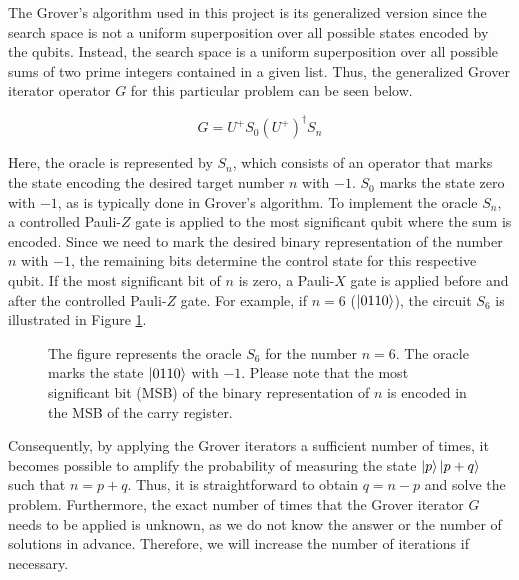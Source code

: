\documentclass[12pt, a4paper]{article}
\begin{document}
    The Grover's algorithm used in this project is its generalized version since the search space is not a uniform superposition over all possible states encoded by the qubits. Instead, the search space is a uniform superposition over all possible sums of two prime integers contained in a given list. Thus, the generalized Grover iterator operator $G$ for this particular problem can be seen below.

    \begin{equation}
        G = U^+ S_0 (U^+)^{\dagger} S_{n}
    \end{equation}

    Here, the oracle is represented by $S_n$, which consists of an operator that marks the state encoding the desired target number $n$ with $-1$. $S_0$ marks the state zero with $-1$, as is typically done in Grover's algorithm. To implement the oracle $S_n$, a controlled Pauli-$Z$ gate is applied to the most significant qubit where the sum is encoded. Since we need to mark the desired binary representation of the number $n$ with $-1$, the remaining bits determine the control state for this respective qubit. If the most significant bit of $n$ is zero, a Pauli-$X$ gate is applied before and after the controlled Pauli-$Z$ gate. For example, if $n=6$ ($\ket{0110}$), the circuit $S_6$ is illustrated in Figure \ref{fig:Oracle}.

    \begin{figure}[h]
        \centering
        \caption{The figure represents the oracle $S_6$ for the number $n=6$. The oracle marks the state $\ket{0110}$ with $-1$. Please note that the most significant bit (MSB) of the binary representation of $n$ is encoded in the MSB of the carry register.}
        \label{fig:Oracle}
    \end{figure}

    Consequently, by applying the Grover iterators a sufficient number of times, it becomes possible to amplify the probability of measuring the state $\ket{p}\ket{p+q}$ such that $n=p+q$. Thus, it is straightforward to obtain $q = n-p$ and solve the problem. Furthermore, the exact number of times that the Grover iterator $G$ needs to be applied is unknown, as we do not know the answer or the number of solutions in advance. Therefore, we will increase the number of iterations if necessary.
\end{document}
